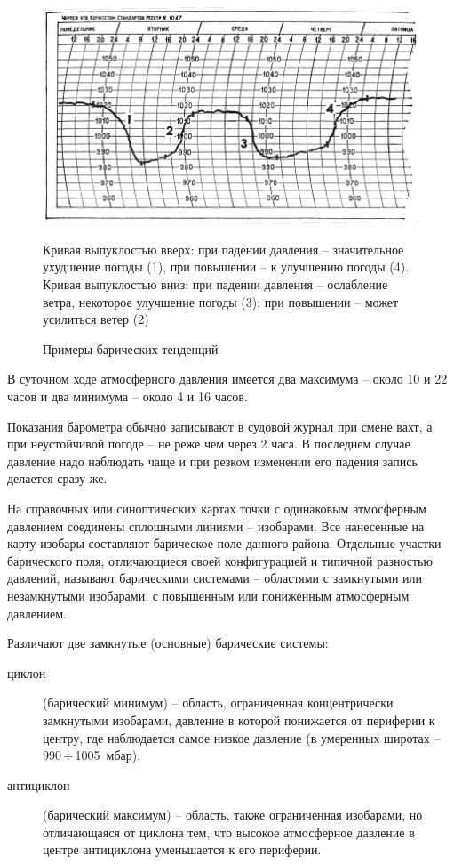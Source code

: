 \documentclass[a4paper, 12pt, twoside, final, book, russian, fittopage, cyremdash]{ncc}
\newcommand{\otdo}{\,\ensuremath{\div}\,}
\begin{document}
\begin{figure}[htb]
  \centering{}
  \includegraphics[scale=1.3]{0111P}
  \caption{Примеры барических тенденций}
  \label{fig:111}
  \small
  \centering{}
  Кривая выпуклостью вверх: при падении давления \--- значительное ухудшение погоды (1), при повышении \--- к улучшению погоды (4). Кривая выпуклостью вниз: при падении давления \--- ослабление ветра, некоторое улучшение погоды (3); при повышении \--- может усилиться ветер (2)
\end{figure}

В суточном ходе атмосферного давления имеется два максимума \--- около 10 и 22 часов и два минимума \--- около 4 и 16 часов.

Показания барометра обычно записывают в судовой журнал при смене вахт, а при неустойчивой погоде \--- не реже чем через 2 часа. В последнем случае давление надо наблюдать чаще и при резком изменении его падения запись делается сразу же.

На справочных или синоптических картах точки с одинаковым атмосферным давлением соединены сплошными линиями \--- изобарами. Все нанесенные на карту изобары составляют барическое поле данного района. Отдельные участки барического поля, отличающиеся своей конфигурацией и типичной разностью давлений, называют барическими системами \--- областями с замкнутыми или незамкнутыми изобарами, с повышенным или пониженным атмосферным давлением.

Различают две замкнутые (основные) барические системы:

\begin{description}
\item[циклон] (барический минимум) \--- область, ограниченная концентрически замкнутыми изобарами, давление в которой понижается от периферии к центру, где наблюдается самое низкое давление (в умеренных широтах \--- 990\otdo 1005~мбар); 
\item[антициклон] (барический максимум) \--- область, также ограниченная изобарами, но отличающаяся от циклона тем, что высокое атмосферное давление в центре антициклона уменьшается к его периферии. 
\end{description}
\end{document}
